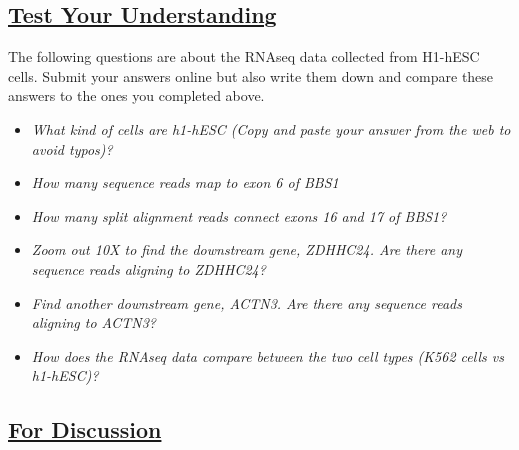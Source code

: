 \documentclass[
]{book}
\providecommand{\tightlist}{%
  \setlength{\itemsep}{0pt}\setlength{\parskip}{0pt}}
\begin{document}
\hypertarget{test-your-understanding-12}{%
\subsection{\texorpdfstring{\href{https://docs.google.com/forms/d/e/1FAIpQLSf4fcc57bfhUFKRBDyqeUTgSEvr4B9TKqiK8-EKO1P3AWJAgA/viewform?usp=sf_link}{Test Your Understanding}}{Test Your Understanding}}\label{test-your-understanding-12}}

The following questions are about the RNAseq data collected from H1-hESC cells. Submit your answers online but also write them down and compare these answers to the ones you completed above.

\begin{itemize}
\tightlist
\item
  \emph{What kind of cells are h1-hESC (Copy and paste your answer from the web to avoid typos)?}
\item
  \emph{How many sequence reads map to exon 6 of BBS1}
\item
  \emph{How many split alignment reads connect exons 16 and 17 of BBS1?}
\item
  \emph{Zoom out 10X to find the downstream gene, ZDHHC24. Are there any sequence reads aligning to ZDHHC24?}
\item
  \emph{Find another downstream gene, ACTN3. Are there any sequence reads aligning to ACTN3?}
\item
  \emph{How does the RNAseq data compare between the two cell types (K562 cells vs h1-hESC)?}
\end{itemize}

\hypertarget{for-discussion-1}{%
\subsection{\texorpdfstring{\href{https://docs.google.com/forms/d/e/1FAIpQLSfvvzUFBLKvVkvlxCiw_rfX5ykAsYTjVueqoJR14zbL4wplJg/viewform?usp=sf_link}{For Discussion}}{For Discussion}}\label{for-discussion-1}}
\end{document}
